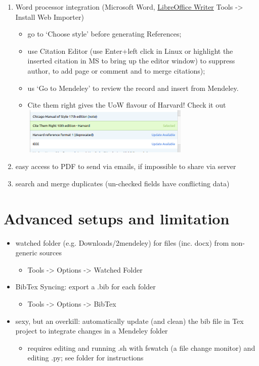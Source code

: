 \documentclass[a4paper,11pt]{article}
\makeatletter
\newcommand\HREF[2]{\hyper@linkurl{#2}{#1}}
\makeatother
\begin{document}
\begin{enumerate}
	\item Word processor integration (Microsoft Word, \href{run:.LibreOffice_plugin_demo.odt}{LibreOffice Writer} Tools -> Install Web Importer)
		\begin{itemize}
		\item go to `Choose style' before generating References;
		\item use Citation Editor (use Enter+left click in Linux or highlight the inserted citation in MS to bring up the editor window) to suppress author, to add page or comment and to merge citations);  
		\item us `Go to Mendeley' to review the record and insert from Mendeley.
		\item Cite them right gives the UoW flavour of Harvard! Check it out \\
		\includegraphics[width=80mm]{pics/cite_them_right.png}%
	\end{itemize}
    \item easy access to PDF to send via emails, if impossible to share via server
    \item search and merge duplicates (un-checked fields have conflicting data)
\end{enumerate}

\section{Advanced setups and limitation}

\begin{itemize}
	\item watched folder (e.g. Downloads/2mendeley) for files (inc. docx) from non-generic sources
		\begin{itemize}
			\item Tools -> Options -> Watched Folder
		\end{itemize}
	\item BibTex Syncing: export a .bib for each folder
		\begin{itemize}
			\item Tools -> Options -> BibTex
		\end{itemize}
	\item sexy, but an overkill: automatically update (and clean) the bib file in Tex project to integrate changes in a Mendeley folder
	\begin{itemize}
		\item requires editing and running .sh with fswatch (a file change monitor) and editing .py; see \HREF{./manage\_bib/}{manage\_bib} folder for instructions
	\end{itemize}
	
\end{itemize}
\end{document}
